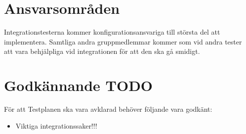 \documentclass[10pt]{article}
\begin{document}
	

	

\section{Ansvarsområden}
	Integrationstesterna kommer konfigurationsansvariga till största del att implementera. Samtliga andra gruppmedlemmar kommer som vid andra tester att vara behjälpliga vid integrationen för att den ska gå smidigt. 


	
	
	
\section{Godkännande {\color{red}TODO}}
	För att Testplanen ska vara avklarad behöver följande vara godkänt:
	\begin{itemize}
	 \item Viktiga integrationssaker!!!
	\end{itemize}
	
\end{document}
